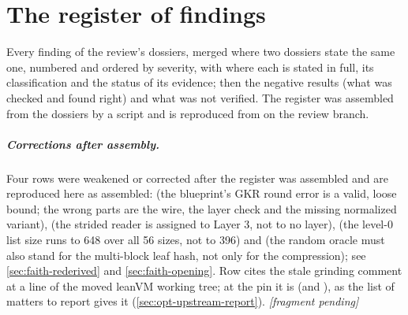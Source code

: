 \chapter{The register of findings}\label{ch:register}

Every finding of the review's dossiers, merged where two dossiers state the same one, numbered
and ordered by severity, with where each is stated in full, its classification and the status
of its evidence; then the negative results (what was checked and found right) and what was not
verified. The register was assembled from the dossiers by a script and is reproduced from
 on the review branch.
\ifregisterready
\paragraph{Corrections after assembly.} Four rows were weakened or corrected after the
register was assembled and are reproduced here as assembled:  (the blueprint's GKR
round error is a valid, loose bound; the wrong parts are the wire, the layer check and the
missing normalized variant),  (the strided reader is assigned to Layer 3, not to no
layer),  (the level-0 list size runs to 648 over all 56 sizes, not to 396) and
 (the random oracle must also stand for the multi-block leaf hash, not only for the
compression); see \cref{sec:faith-rederived} and \cref{sec:faith-opening}. Row  cites the stale
grinding comment at a line of the moved leanVM working tree; at the pin it is
 (and ), as the list of matters to
report gives it (\cref{sec:opt-upstream-report}).
\else\emph{[fragment pending]}\fi
